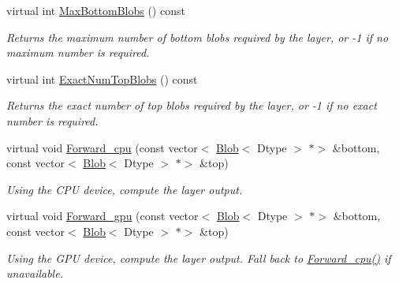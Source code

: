 \begin{DoxyCompactItemize}
virtual int \mbox{\hyperlink{classcaffe_1_1_bias_layer_abdb89e3bc940f999d1d4da83de90a97c}{Max\+Bottom\+Blobs}} () const
\begin{DoxyCompactList}\small\item\em Returns the maximum number of bottom blobs required by the layer, or -\/1 if no maximum number is required. \end{DoxyCompactList}\item 
virtual int \mbox{\hyperlink{classcaffe_1_1_bias_layer_a9552dc137a5bcbdd17bdb3321d678595}{Exact\+Num\+Top\+Blobs}} () const
\begin{DoxyCompactList}\small\item\em Returns the exact number of top blobs required by the layer, or -\/1 if no exact number is required. \end{DoxyCompactList}\item 
\mbox{\label{classcaffe_1_1_bias_layer_abbab2f856ed656aefc4fa7049c77d008}} 
virtual void \mbox{\hyperlink{classcaffe_1_1_bias_layer_abbab2f856ed656aefc4fa7049c77d008}{Forward\+\_\+cpu}} (const vector$<$ \mbox{\hyperlink{classcaffe_1_1_blob}{Blob}}$<$ Dtype $>$ $\ast$$>$ \&bottom, const vector$<$ \mbox{\hyperlink{classcaffe_1_1_blob}{Blob}}$<$ Dtype $>$ $\ast$$>$ \&top)
\begin{DoxyCompactList}\small\item\em Using the C\+PU device, compute the layer output. \end{DoxyCompactList}\item 
\mbox{\label{classcaffe_1_1_bias_layer_aa767113391a272912043f77d5acccb3e}} 
virtual void \mbox{\hyperlink{classcaffe_1_1_bias_layer_aa767113391a272912043f77d5acccb3e}{Forward\+\_\+gpu}} (const vector$<$ \mbox{\hyperlink{classcaffe_1_1_blob}{Blob}}$<$ Dtype $>$ $\ast$$>$ \&bottom, const vector$<$ \mbox{\hyperlink{classcaffe_1_1_blob}{Blob}}$<$ Dtype $>$ $\ast$$>$ \&top)
\begin{DoxyCompactList}\small\item\em Using the G\+PU device, compute the layer output. Fall back to \mbox{\hyperlink{classcaffe_1_1_bias_layer_abbab2f856ed656aefc4fa7049c77d008}{Forward\+\_\+cpu()}} if unavailable. \end{DoxyCompactList}\item 
\mbox{\label{classcaffe_1_1_bias_layer_a644c6ae32fde130475b8de04db36ea5b}} 

\end{DoxyCompactItemize}
